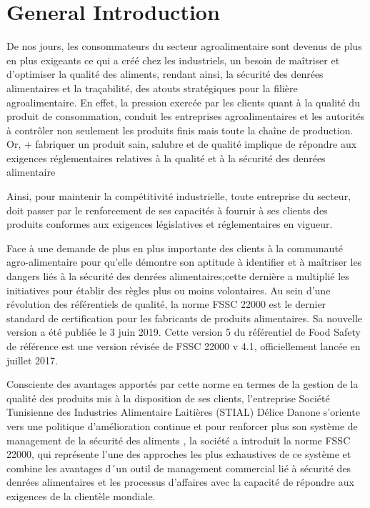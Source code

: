 \chapter*{General Introduction}
\graphicspath{{Introduction/figures/}}
\begin{spacing}{1.2}

De nos jours, les consommateurs du secteur agroalimentaire sont devenus de plus en plus exigeants ce qui a créé chez les industriels, un besoin de maîtriser et d'optimiser la qualité des aliments, rendant ainsi, la sécurité des denrées alimentaires et la traçabilité, des atouts stratégiques pour la filière agroalimentaire. En effet, la pression exercée par les clients quant à la qualité du produit de consommation, conduit les entreprises agroalimentaires et les autorités à contrôler non seulement les produits finis mais toute la chaîne de production. Or, + fabriquer un produit sain, salubre et de qualité implique de répondre aux exigences réglementaires relatives à la qualité et à la sécurité des denrées alimentaire\newline


Ainsi, pour maintenir la compétitivité industrielle, toute entreprise du secteur, doit passer par le renforcement de ses capacités à fournir à ses clients des produits conformes aux exigences législatives et réglementaires en vigueur.\newline


Face à une demande de plus en plus importante des clients à la communauté agro-alimentaire pour qu’elle démontre son aptitude à identifier et à maîtriser les dangers liés à la sécurité des denrées alimentaires;cette dernière a multiplié les initiatives pour établir des règles plus ou moins volontaires. Au sein d’une révolution des référentiels de qualité, la norme FSSC 22000  est le dernier standard de certification pour les fabricants de produits alimentaires. Sa nouvelle version a été publiée le 3 juin 2019. Cette version 5 du référentiel de Food Safety de référence est une version révisée de FSSC 22000 v 4.1, officiellement lancée en juillet 2017.\newline


Consciente des avantages apportés par cette norme en termes de la gestion de la qualité des produits mis à la disposition de ses clients, l’entreprise  Société Tunisienne des Industries Alimentaire Laitières (STIAL) Délice Danone s’oriente vers une politique d’amélioration continue et pour renforcer plus son système de management de la sécurité des aliments , la société a introduit la norme FSSC 22000, qui représente l’une des approches les plus exhaustives de ce système et combine les avantages d´un outil de management commercial lié à sécurité des denrées alimentaires et les processus d'affaires avec la capacité de répondre aux exigences de la clientèle mondiale.\newline



\end{spacing}

